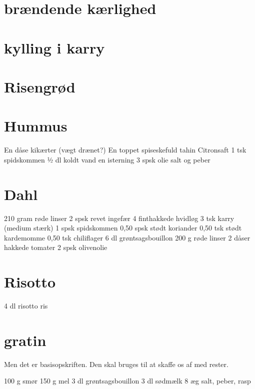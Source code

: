 \documentclass[
]{book}
\begin{document}
\hypertarget{bruxe6ndende-kuxe6rlighed}{%
\section{brændende kærlighed}\label{bruxe6ndende-kuxe6rlighed}}

\hypertarget{kylling-i-karry}{%
\section{kylling i karry}\label{kylling-i-karry}}

\hypertarget{risengruxf8d}{%
\section{Risengrød}\label{risengruxf8d}}

\hypertarget{hummus}{%
\section{Hummus}\label{hummus}}

En dåse kikærter (vægt drænet?)
En toppet spiseskefuld tahin
Citronsaft
1 tsk spidskommen
½ dl koldt vand
en isterning
3 spsk olie
salt og peber

\hypertarget{dahl}{%
\section{Dahl}\label{dahl}}

210 gram røde linser
2 spsk revet ingefær
4 finthakkede hvidløg
3 tsk karry (medium stærk)
1 spsk spidskommen
0,50 spsk stødt koriander
0,50 tsk stødt kardemomme
0,50 tsk chiliflager
6 dl grøntsagsbouillon
200 g røde linser
2 dåser hakkede tomater
2 spsk olivenolie

\hypertarget{risotto}{%
\section{Risotto}\label{risotto}}

4 dl risotto ris

\hypertarget{gratin-1}{%
\section{gratin}\label{gratin-1}}

Men det er basisopskriften. Den skal bruges til at skaffe os af med rester.

100 g smør
150 g mel
3 dl grøntsagsbouillon
3 dl sødmælk
8 æg
salt, peber, rasp
\end{document}
